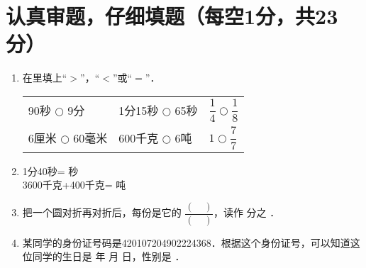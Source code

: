 \documentclass[12pt,twoside,space]{ctexart}
\begin{document}
\juemi %

  \section{认真审题，仔细填题（每空1分，共23分）}
    \begin{enumerate}[itemsep=-0.2em,topsep=0pt]
      \item 在里填上“$>$”，“$<$”或“$=$”．\\
          \begin{tabular*}{\textwidth}{@{\extracolsep{\fill}} lll}
            90秒 $\bigcirc$ 9分 & 1分15秒 $\bigcirc$ 65秒 & $\dfrac{1}{4} \bigcirc \dfrac{1}{8}$ \\
            6厘米 $\bigcirc$ 60毫米 & 600千克 $\bigcirc$ 6吨 & $1 \bigcirc \dfrac{7}{7}$
          \end{tabular*}

        \item 1分40秒= \underline{\hspace{3em}}秒\\
        3600千克+400千克= \underline{\hspace{3em}}吨

        \item 把一个圆对折再对折后，每份是它的 $\dfrac{(\hspace{1em})}{(\hspace{1em})}$，读作 \underline{\hspace{2em}}分之 \underline{\hspace{2em}} ．

        \item 某同学的身份证号码是420107204902224368．根据这个身份证号，可以知道这位同学的生日是 \underline{\hspace{2em}} 年 \underline{\hspace{2em}} 月 \underline{\hspace{2em}} 日，性别是 \underline{\hspace{2em}}．
    \end{enumerate}
\end{document}
